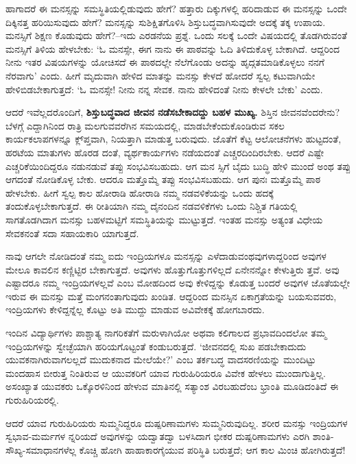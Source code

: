 ಹಾಗಾದರೆ ಈ ಮನಸ್ಸನ್ನು ಸಮಸ್ಥಿತಿಯಲ್ಲಿಡುವುದು ಹೇಗೆ? ಹತ್ತಾರು ದಿಕ್ಕುಗಳಲ್ಲಿ ಹರಿದಾಡುವ ಈ ಮನಸ್ಸನ್ನು ಒಂದೇ ದಿಕ್ಕಿನತ್ತ ಹರಿಯಿಸುವುದು ಹೇಗೆ? ಮನಸ್ಸನ್ನು ಸುಶಿಕ್ಷಿತಗೊಳಿಸಿ ಶಿಸ್ತುಬದ್ಧವಾಗಿಸುವುದೇ ಅದಕ್ಕೆ ತಕ್ಕ ಉಪಾಯ. ಮನಸ್ಸಿಗೆ ಶಿಕ್ಷಣ ಕೊಡುವುದು ಹೇಗೆ?–ಇದು ಎರಡನೆಯ ಪ್ರಶ್ನೆ. ಒಂದು ಸಲಕ್ಕೆ ಒಂದೇ ವಿಷಯದಲ್ಲಿ ತೊಡಗಿರುವಂತೆ ಮನಸ್ಸಿಗೆ ತಿಳಿಯ ಹೇಳಬೇಕು: ‘ಓ ಮನಸ್ಸೇ, ಈಗ ನಾನು ಈ ಪಾಠವನ್ನು ಓದಿ ತಿಳಿದುಕೊಳ್ಳ ಬೇಕಾಗಿದೆ. ಆದ್ದರಿಂದ ನೀನು ಇತರ ವಿಷಯಗಳನ್ನು ಯೋಚಿಸದೆ ಈ ಪಾಠದಲ್ಲೇ ನೆಲೆಗೊಂಡು ಅದನ್ನು ಹೃದ್ಗತಮಾಡಿಕೊಳ್ಳಲು ನನಗೆ ನೆರವಾಗು’ ಎಂದು. ಹೀಗೆ ಮೃದುವಾಗಿ ಹೇಳಿದ ಮಾತನ್ನು ಮನಸ್ಸು ಕೇಳದೆ ಹೋದರೆ ಸ್ವಲ್ಪ ಕಟುವಾಗಿಯೇ ಹೇಳಿಬಿಡಬೇಕಾಗುತ್ತದೆ: ‘ಓ ಮನಸ್ಸೇ! ನೀನು ನನ್ನ ಸೇವಕ. ನಾನು ಹೇಳಿದಂತೆ ನೀನು ಕೇಳಲೇ ಬೇಕು’ ಎಂದು.

ಆದರೆ ಇವೆಲ್ಲದರೊಂದಿಗೆ, \textbf{ಶಿಸ್ತುಬದ್ಧವಾದ ಜೀವನ ನಡೆಸಬೇಕಾದದ್ದು ಬಹಳ ಮುಖ್ಯ.} ಶಿಸ್ತಿನ ಜೀವನವೆಂದರೇನು? ಬೆಳಗ್ಗೆ ಎದ್ದಾಗಿನಿಂದ ರಾತ್ರಿ ಮಲಗುವವರೆಗಿನ ಸಮಯದಲ್ಲಿ, ಮಾಡಬೇಕೆಂದುಕೊಂಡಿರುವ ಸಕಲ ಕಾರ್ಯಕಲಾಪಗಳನ್ನೂ ಕ್ಲ್​ಪ್ತವಾಗಿ, ನಿಯತ್ತಾಗಿ ಮಾಡುತ್ತ ಬರುವುದು. ಜೊತೆಗೆ ಕೆಟ್ಟ ಆಲೋಚನೆಗಳು ಹುಟ್ಟದಂತೆ, ಹರಟೆಯ ಮಾತುಗಳು ಹೊರಡ ದಂತೆ, ವ್ಯರ್ಥಕಾರ್ಯಗಳು ನಡೆಯದಂತೆ ಎಚ್ಚರದಿಂದಿರಬೇಕು. ಆದರೆ ಎಷ್ಟೇ ಎಚ್ಚರಿಕೆಯಿಂದಿದ್ದರೂ ನಡುನಡುವೆ ತಪ್ಪು ಸಂಭವಿಸಬಹುದು. ಆಗ ಮನ ಸ್ಸಿಗೆ ಬೈದು ಬುದ್ಧಿ ಹೇಳಿ ಮುಂದೆ ಅಂಥ ತಪ್ಪು ಆಗದಂತೆ ನೋಡಿಕೊಳ್ಳ ಬೇಕು. ಆದರೂ ಮತ್ತೊಮ್ಮೆ ತಪ್ಪು ಸಂಭವಿಸಬಹುದು. ಆಗ ಪುನಃ ಮತ್ತೊಮ್ಮೆ ಪಾಠ ಹೇಳಬೇಕು. ಹೀಗೆ ಸ್ವಲ್ಪ ಕಾಲ ಹೋರಾಡಿ ಹೋರಾಡಿ ನಮ್ಮ ನಡವಳಿಕೆಯನ್ನು ಒಂದು ಹದಕ್ಕೆ ತಂದುಕೊಳ್ಳಬೇಕಾಗುತ್ತದೆ. ಈ ರೀತಿಯಾಗಿ ನಮ್ಮ ದೈನಂದಿನ ನಡವಳಿಕೆಗಳು ಒಂದು ನಿಶ್ಚಿತ ಗತಿಯಲ್ಲಿ ಸಾಗತೊಡಗಿದಾಗ ಮನಸ್ಸು ಬಹಳಮಟ್ಟಿಗೆ ಸಮಸ್ಥಿತಿಯನ್ನು ಮುಟ್ಟುತ್ತದೆ. ಇಂತಹ ಮನಸ್ಸು ಅತ್ಯಂತ ವಿಧೇಯ ಸೇವಕನಂತೆ ಸದಾ ಸಹಾಯಕಾರಿ ಯಾಗುತ್ತದೆ.

ನಾವು ಆಗಲೇ ನೋಡಿದಂತೆ ನಮ್ಮ ಐದು ಇಂದ್ರಿಯಗಳೂ ಮನಸ್ಸನ್ನು ಎಳೆದಾಡುವಂಥವುಗಳಾದ್ದರಿಂದ ಅವುಗಳ ಮೇಲೂ ಕಾವಲಿನ ಕಣ್ಣಿಟ್ಟಿರ ಬೇಕಾಗುತ್ತದೆ. ಅವುಗಳು ಹೊತ್ತುಗೊತ್ತುಗಳಿಲ್ಲದೆ ಏನೇನನ್ನೋ ಕೇಳುತ್ತಿರು ತ್ತವೆ. ಅವು ಎಷ್ಟಾದರೂ ನಮ್ಮ ಇಂದ್ರಿಯಗಳಲ್ಲವೆ ಎಂಬ ಮೋಹದಿಂದ ಅವು ಕೇಳಿದ್ದನ್ನು ಕೊಡುತ್ತ ಬಂದರೆ ಅವುಗಳ ಜೊತೆಯಲ್ಲೇ ಇರುವ ಈ ಮನಸ್ಸು ಮತ್ತೆ ಮಂಗನಂತಾಗುವುದು ಖಂಡಿತ. ಆದ್ದರಿಂದ ಮನಸ್ಸಿನ ಏಕಾಗ್ರತೆಯನ್ನು ಬಯಸುವವರು, ಇಂದ್ರಿಯಗಳು ಕೇಳಿದ್ದನ್ನೆಲ್ಲ ಕೊಟ್ಟು ಅತಿ ಮುದ್ದು ಮಾಡುವ ಅವಿವೇಕಕ್ಕೆ ಹೋಗಬಾರದು. 

ಇಂದಿನ ವಿದ್ಯಾರ್ಥಿಗಳು ಪಾಶ್ಚಾತ್ಯ ನಾಗರಿಕತೆಗೆ ಮರುಳಾಗಿಯೋ ಅಥವಾ ಕಲಿಗಾಲದ ಪ್ರಭಾವದಿಂದಲೋ ತಮ್ಮ ಇಂದ್ರಿಯಗಳನ್ನು ಸ್ವೇಚ್ಛೆಯಾಗಿ ಹರಿಯಗೊಟ್ಟಂತೆ ಕಂಡುಬರುತ್ತದೆ. ‘ಜೀವನದಲ್ಲಿ ಸುಖ ಪಡಬೇಕಾದುದು ಯುವಕನಾಗಿರುವಾಗಲಲ್ಲದೆ ಮುದುಕನಾದ ಮೇಲೆಯೇ?’ ಎಂಬ ತರ್ಕಬದ್ಧ ವಾದಸರಣಿಯನ್ನು ಮುಂದಿಟ್ಟು ಮಂದಹಾಸ ಬೀರುತ್ತ ನಿಂತಿರುವ ಆ ಯುವಕರಿಗೆ ಯಾವ ಗುರುಹಿರಿಯರೂ ವಿವೇಕ ಹೇಳಲು ಮುಂದಾಗುತ್ತಿಲ್ಲ. ಅಸಂಖ್ಯಾತ ಯುವಕರು ಒಕ್ಕೊರಳಿನಿಂದ ಹೇಳುವ ಮಾತಿನಲ್ಲಿ ಸತ್ಯಾಂಶ ವಿರಬಹುದೆಂಬ ಭ್ರಾಂತಿ ಮೂಡಿದಂತಿದೆ ಈ ಗುರುಹಿರಿಯರಲ್ಲಿ.

ಆದರೆ ಯಾವ ಗುರುಹಿರಿಯರು ಸುಮ್ಮನಿದ್ದರೂ ದುಷ್ಪರಿಣಾಮಗಳು ಸುಮ್ಮನಿರುವುದಿಲ್ಲ. ಶರೀರ ಮನಸ್ಸು ಇಂದ್ರಿಯಗಳ ಸ್ವಭಾವ-ಮರ್ಮಗಳ ನ್ನರಿಯದೆ ಅವುಗಳನ್ನು ಯದ್ವಾತದ್ವಾ ಬಳಸಿದಾಗ ಭೀಕರ ದುಷ್ಪರಿಣಾಮಗಳು ಎರಗಿ ಶಾಂತಿ-ಸೌಖ್ಯ-ಸಮಾಧಾನಗಳೆಲ್ಲ ಕೊಚ್ಚಿ ಹೋಗಿ ಹಾಹಾಕಾರಗೈಯುವ ಪರಿಸ್ಥಿತಿ ಬರುತ್ತದೆ; ಆಗ ಕಾಲ ಮಿಂಚಿ ಹೋಗಿರುತ್ತದೆ!

